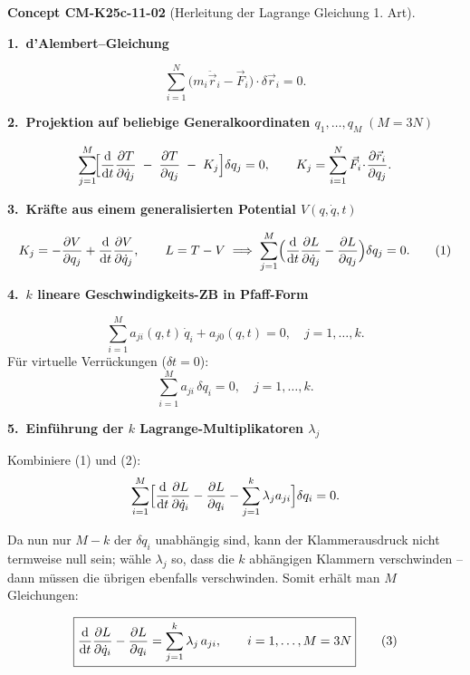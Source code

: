 \documentclass[10pt, letterpaper]{article}
\newcommand{\CustomHeading}[3]{%
  \par\medskip\noindent%
  \textbf{#1 #2} \textnormal{(#3)}.\enskip%
}
\newenvironment{CONC}[2]{\begin{unitbox}\CustomHeading{Concept}{#1}{#2}}{\end{unitbox}}
\begin{document}

\begin{CONC}{CM-K25c-11-02}{Herleitung der Lagrange Gleichung 1. Art}
\textbf{1.\ d’Alembert–Gleichung}

\[
  \sum_{i=1}^{N}
    \bigl(m_i\ddot{\vec r}_i-\vec F_i\bigr)\!\cdot\!\delta\vec r_i=0 .
\]

\textbf{2.\ Projektion auf beliebige General­koordinaten
           $q_1,\dots,q_M\;(M=3N)$}

\[
  \sum_{j=1}^{M}
    \!\Bigl[
      \frac{\mathrm d}{\mathrm dt}
        \frac{\partial T}{\partial\dot q_j}
      \;-\;
      \frac{\partial T}{\partial q_j}
      \;-\;
      K_j
    \Bigr]\delta q_j = 0,
  \qquad
  K_j
  =\sum_{i=1}^{N}\vec F_i\!\cdot\!
     \frac{\partial\vec r_i}{\partial q_j}.
\]

\textbf{3.\ Kräfte aus einem generalisierten Potential
           $V(q,\dot q,t)$}

\[
  K_j
  =-\frac{\partial V}{\partial q_j}
    +\frac{\mathrm d}{\mathrm dt}
       \frac{\partial V}{\partial\dot q_j},
  \qquad
  L=T-V
  \;\Longrightarrow\;
  \sum_{j=1}^{M}
    \Bigl(
      \frac{\mathrm d}{\mathrm dt}
        \frac{\partial L}{\partial\dot q_j}
      -\frac{\partial L}{\partial q_j}
    \Bigr)\delta q_j = 0 .
\tag{1}
\]

\textbf{4.\ $k$ lineare Geschwindigkeits-ZB in Pfaff-Form}

\[
  \sum_{i=1}^{M}
    a_{ji}(q,t)\,\dot q_i + a_{j0}(q,t)=0,
  \quad
  j=1,\dots,k.
\]
Für virtuelle Verrückungen ($\delta t=0$):
\[
  \sum_{i=1}^{M}a_{ji}\,\delta q_i = 0,
  \quad j=1,\dots,k .
\tag{2}
\]

\textbf{5.\ Einführung der $k$ Lagrange-Multiplikatoren $\lambda_j$}

Kombiniere (1) und (2):
\[
  \sum_{i=1}^{M}
    \Bigl[
      \frac{\mathrm d}{\mathrm dt}
        \frac{\partial L}{\partial\dot q_i}
      -\frac{\partial L}{\partial q_i}
      -\sum_{j=1}^{k}\lambda_j a_{ji}
    \Bigr]\delta q_i = 0 .
\]

Da nun nur $M-k$ der $\delta q_i$ unabhängig sind, kann der Klammer­ausdruck
nicht termweise null sein; wähle $\lambda_j$ so, dass die $k$ abhängigen
Klammern verschwinden – dann müssen die übrigen ebenfalls verschwinden.
Somit erhält man $M$ Gleichungen:

\[
  \boxed{%
    \frac{\mathrm d}{\mathrm dt}
      \frac{\partial L}{\partial\dot q_i}
    -\frac{\partial L}{\partial q_i}
    =\sum_{j=1}^{k}\lambda_j\,a_{ji},
    \qquad
    i=1,\dots,M=3N
  }
  \tag{3}
\]


\end{CONC}
\end{document}
